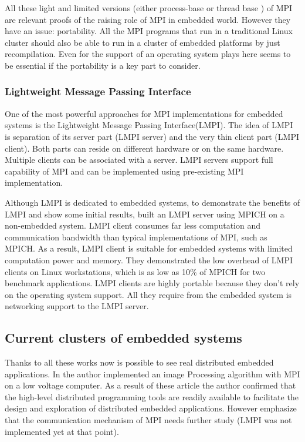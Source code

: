 All these light and limited versions (either process-base or
thread base ) of MPI are relevant proofs of the raising role of MPI in embedded
world. However they have an issue: portability. All the MPI programs that run
in a traditional Linux cluster should also be able to run in a cluster of
embedded platforms  by just recompilation.  Even for \cite{Gallego} the support
of an operating system plays here seems to be essential if the portability is a
key part to consider.

\subsubsection{Lightweight Message Passing Interface}

One of the most powerful approaches for MPI implementations for embedded
systems is the Lightweight Message Passing Interface(LMPI)\cite{Abgaria}. The
idea of LMPI is separation of its server part (LMPI server) and the very thin
client part (LMPI client). Both parts can reside on different hardware or on
the same hardware. Multiple clients can be associated with a server. LMPI
servers support full capability of MPI and can be implemented using
pre-existing MPI implementation. 

Although LMPI is dedicated to embedded systems, to demonstrate the benefits of
LMPI and show some initial results, \cite{Abgaria} built an LMPI server using
MPICH on a non-embedded system. LMPI client consumes far less computation and
communication bandwidth than typical implementations of MPI, such as MPICH.  As
a result, LMPI client is suitable for embedded systems with limited computation
power and memory. They demonstrated the low overhead of LMPI clients on Linux
workstations, which is as low as 10\% of MPICH for two benchmark applications.
LMPI clients are highly portable because they don't rely on the operating
system support. All they require from the embedded system is networking support
to the LMPI server.

\subsection{Current clusters of embedded systems}

Thanks to all these works now is possible to see real distributed embedded
applications. In \cite{Liu} the author implemented an image Processing algorithm
with MPI on a low voltage computer. As a result of these article the author
confirmed that the high-level distributed programming tools are readily
available to facilitate the design and exploration of distributed embedded
applications. However emphasize that the communication mechanism of MPI needs
further study (LMPI was not implemented yet at that point). 


